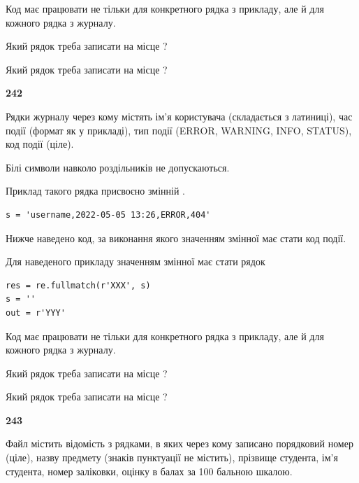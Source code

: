 Код має працювати не тільки для конкретного рядка з прикладу, але й для кожного рядка з журналу.




Який рядок треба записати на місце  ?\par
\vspace{5mm}


Який рядок треба записати на місце  ?\par


\newpage

{\begin {center}\textbf{ 242}\end {center}}\par
Рядки журналу через кому містять ім'я користувача (складається з латиниці), час події (фор\-мат як у прикладі), тип події (ERROR, WARNING, INFO, STATUS), код події (ціле).

Білі символи навколо роздільників не допускаються.

Приклад такого рядка присвоєно змінній .



\begin{verbatim}
s = 'username,2022-05-05 13:26,ERROR,404'
\end{verbatim}


Нижче наведено код, за виконання якого значенням змінної  має стати код події.

Для наведеного прикладу значенням змінної  має стати рядок 



\begin{verbatim}
res = re.fullmatch(r'XXX', s)
s = ''
out = r'YYY'
\end{verbatim}


Код має працювати не тільки для конкретного рядка з прикладу, але й для кожного рядка з журналу.




Який рядок треба записати на місце  ?\par
\vspace{5mm}


Який рядок треба записати на місце  ?\par


\newpage

{\begin {center}\textbf{ 243}\end {center}}\par
Файл  містить відомість з рядками, в яких через кому записано поряд\-ковий номер (ціле), назву предмету (знаків пунктуації не містить), прізвище студента, ім'я студента, номер заліковки, оцінку в балах за 100 бальною шкалою.

